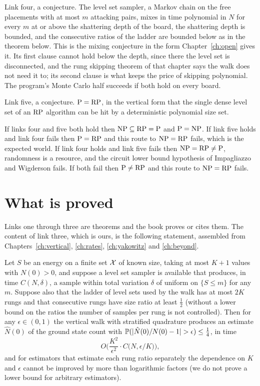 Link four, a conjecture. The level set sampler, a Markov chain on the free placements with at most $m$ attacking pairs, mixes in time polynomial in $N$ for every $m$ at or above the shattering depth of the board, the shattering depth is bounded, and the consecutive ratios of the ladder are bounded below as in the theorem below. This is the mixing conjecture in the form Chapter~\ref{ch:open} gives it. Its first clause cannot hold below the depth, since there the level set is disconnected, and the rung skipping theorem of that chapter says the walk does not need it to; its second clause is what keeps the price of skipping polynomial. The program's Monte Carlo half succeeds if both hold on every board.

Link five, a conjecture. $\mathrm{P} = \mathrm{RP}$, in the vertical form that the single dense level set of an $\mathrm{RP}$ algorithm can be hit by a deterministic polynomial size set.

If links four and five both hold then $\mathrm{NP} \subseteq \mathrm{RP} = \mathrm{P}$ and $\mathrm{P} = \mathrm{NP}$. If link five holds and link four fails then $\mathrm{P} = \mathrm{RP}$ and this route to $\mathrm{NP} = \mathrm{RP}$ fails, which is the expected world. If link four holds and link five fails then $\mathrm{NP} = \mathrm{RP} \neq \mathrm{P}$, randomness is a resource, and the circuit lower bound hypothesis of Impagliazzo and Wigderson fails. If both fail then $\mathrm{P} \neq \mathrm{RP}$ and this route to $\mathrm{NP} = \mathrm{RP}$ fails.

\section{What is proved}

Links one through three are theorems and the book proves or cites them. The content of link three, which is ours, is the following statement, assembled from Chapters~\ref{ch:vertical}, \ref{ch:rates}, \ref{ch:yakowitz} and \ref{ch:beyond}.

\begin{theorem}
\label{thm:condfpras}
Let $S$ be an energy on a finite set $\mathcal{X}$ of known size, taking at most $K + 1$ values with $N(0) > 0$, and suppose a level set sampler is available that produces, in time $C(N, \delta)$, a sample within total variation $\delta$ of uniform on $\{ S \le m \}$ for any $m$. Suppose also that the ladder of level sets used by the walk has at most $2K$ rungs and that consecutive rungs have size ratio at least $\tfrac12$ (without a lower bound on the ratios the number of samples per rung is not controlled). Then for any $\epsilon \in (0, 1)$ the vertical walk with stratified quadrature produces an estimate $\hat N(0)$ of the ground state count with $\mathbb{P}( |\hat N(0) / N(0) - 1| > \epsilon ) \le \tfrac14$, in time
\[
O\Big( \frac{K^2}{\epsilon^2} \cdot C\big(N, \epsilon / K\big) \Big) ,
\]
and for estimators that estimate each rung ratio separately the dependence on $K$ and $\epsilon$ cannot be improved by more than logarithmic factors (we do not prove a lower bound for arbitrary estimators).
\end{theorem}

